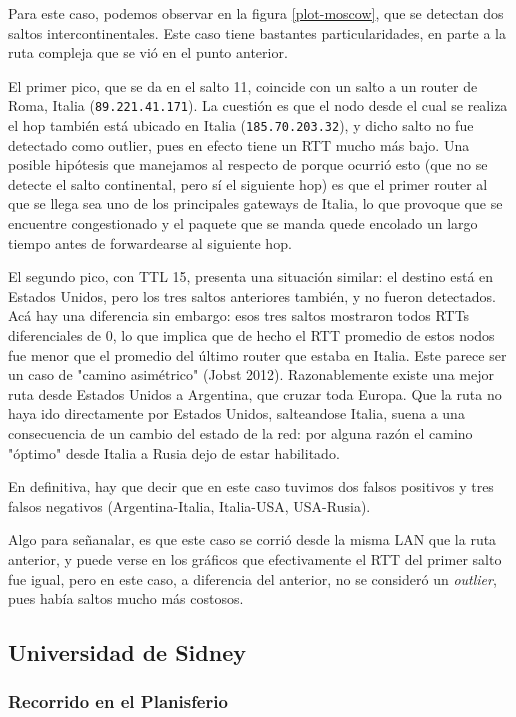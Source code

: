 Para este caso, podemos observar en la figura \ref{plot-moscow}, que se detectan dos saltos intercontinentales. Este caso tiene bastantes particularidades, en parte a la ruta compleja que se vió en el punto anterior. 

El primer pico, que se da en el salto 11, coincide con un salto a un router de Roma, Italia (\texttt{89.221.41.171}). La cuestión es que el nodo desde el cual se realiza el hop también está ubicado en Italia (\texttt{185.70.203.32}), y dicho salto no fue detectado como outlier, pues en efecto tiene un RTT mucho más bajo. Una posible hipótesis que manejamos al respecto de porque ocurrió esto (que no se detecte el salto continental, pero sí el siguiente hop) es que el primer router al que se llega sea uno de los principales gateways de Italia, lo que provoque que se encuentre congestionado y el paquete que se manda quede encolado un largo tiempo antes de forwardearse al siguiente hop. 

El segundo pico, con TTL 15, presenta una situación similar: el destino está en Estados Unidos, pero los tres saltos anteriores también, y no fueron detectados. Acá hay una diferencia sin embargo: esos tres saltos mostraron todos RTTs diferenciales de 0, lo que implica que de hecho el RTT promedio de estos nodos fue menor que el promedio del último router que estaba en Italia. Este parece ser un caso de "camino asimétrico" (Jobst 2012). Razonablemente existe una mejor ruta desde Estados Unidos a Argentina, que cruzar toda Europa. Que la ruta no haya ido directamente por Estados Unidos, salteandose Italia, suena a una consecuencia de un cambio del estado de la red: por alguna razón el camino "óptimo" desde Italia a Rusia dejo de estar habilitado.

En definitiva, hay que decir que en este caso tuvimos dos falsos positivos y tres falsos negativos (Argentina-Italia, Italia-USA, USA-Rusia). 

Algo para señanalar, es que este caso se corrió desde la misma LAN que la ruta anterior, y puede verse en los gráficos que efectivamente el RTT del primer salto fue igual, pero en este caso, a diferencia del anterior, no se consideró un \emph{outlier}, pues había saltos mucho más costosos.

\subsection*{Universidad de Sidney}

\subsubsection*{Recorrido en el Planisferio}

